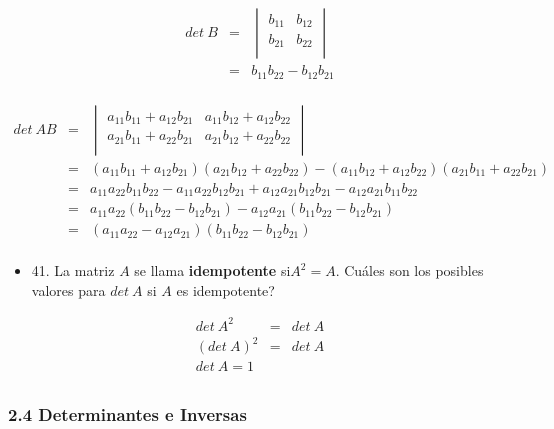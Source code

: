 \documentclass[
]{article}
\begin{document}
\[\begin{matrix}
det\ B & = & \begin{vmatrix}
b_{11} & b_{12} \\
b_{21} & b_{22} \\
\end{vmatrix} \\
 & = & b_{11}b_{22} - b_{12}b_{21} \\
\end{matrix}\]

\[\begin{matrix}
det\ AB & = & \begin{vmatrix}
a_{11}b_{11} + a_{12}b_{21} & a_{11}b_{12} + a_{12}b_{22} \\
a_{21}b_{11} + a_{22}b_{21} & a_{21}b_{12} + a_{22}b_{22} \\
\end{vmatrix} \\
 & = & (a_{11}b_{11} + a_{12}b_{21})(a_{21}b_{12} + a_{22}b_{22}) - (a_{11}b_{12} + a_{12}b_{22})(a_{21}b_{11} + a_{22}b_{21}) \\
 & = & a_{11}a_{22}b_{11}b_{22} - a_{11}a_{22}b_{12}b_{21} + a_{12}a_{21}b_{12}b_{21} - a_{12}a_{21}b_{11}b_{22} \\
 & = & a_{11}a_{22}(b_{11}b_{22} - b_{12}b_{21}) - a_{12}a_{21}(b_{11}b_{22} - b_{12}b_{21}) \\
 & = & (a_{11}a_{22} - a_{12}a_{21})(b_{11}b_{22} - b_{12}b_{21}) \\
\end{matrix}\]

\begin{itemize}
\item
  41. La matriz \(A\) se llama \textbf{idempotente} si\(A^{2} = A\).
  Cuáles son los posibles valores para \(det\ A\) si \(A\) es
  idempotente?
\end{itemize}

\[\begin{matrix}
det\ A^{2} & = & det\ A \\
(det\ A)^{2} & = & det\ A \\
det\ A = 1 \\
\end{matrix}\]

\hypertarget{determinantes-e-inversas}{%
\subsubsection{2.4 Determinantes e
Inversas}\label{determinantes-e-inversas}}
\end{document}
